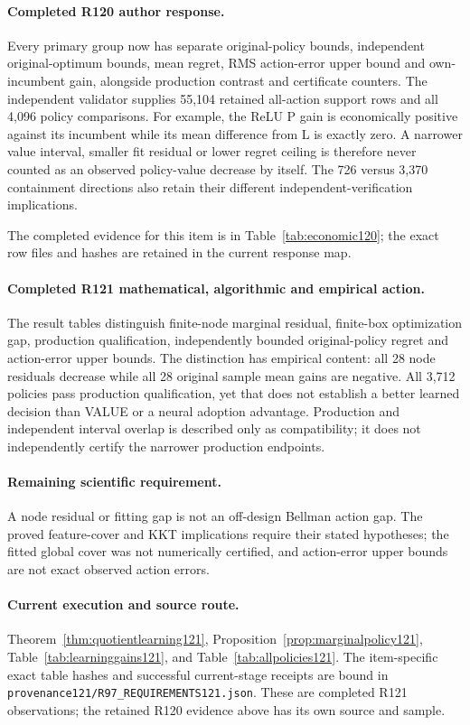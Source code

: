 \paragraph{Completed R120 author response.}
Every primary group now has separate original-policy bounds, independent original-optimum bounds, mean regret, RMS action-error upper bound and own-incumbent gain, alongside production contrast and certificate counters. The independent validator supplies 55,104 retained all-action support rows and all 4,096 policy comparisons. For example, the ReLU P gain is economically positive against its incumbent while its mean difference from L is exactly zero. A narrower value interval, smaller fit residual or lower regret ceiling is therefore never counted as an observed policy-value decrease by itself. The 726 versus 3,370 containment directions also retain their different independent-verification implications.

The completed evidence for this item is in Table~\ref{tab:economic120}; the exact row files and hashes are retained in the current response map.

\paragraph{Completed R121 mathematical, algorithmic and empirical action.}
The result tables distinguish finite-node marginal residual, finite-box optimization gap, production qualification, independently bounded original-policy regret and action-error upper bounds. The distinction has empirical content: all 28 node residuals decrease while all 28 original sample mean gains are negative. All 3,712 policies pass production qualification, yet that does not establish a better learned decision than VALUE or a neural adoption advantage. Production and independent interval overlap is described only as compatibility; it does not independently certify the narrower production endpoints.

\paragraph{Remaining scientific requirement.}
A node residual or fitting gap is not an off-design Bellman action gap. The proved feature-cover and KKT implications require their stated hypotheses; the fitted global cover was not numerically certified, and action-error upper bounds are not exact observed action errors.

\paragraph{Current execution and source route.}
Theorem~\ref{thm:quotientlearning121}, Proposition~\ref{prop:marginalpolicy121}, Table~\ref{tab:learninggains121}, and Table~\ref{tab:allpolicies121}.
The item-specific exact table hashes and successful current-stage receipts are bound in \nolinkurl{provenance121/R97_REQUIREMENTS121.json}. These are completed R121 observations; the retained R120 evidence above has its own source and sample.

